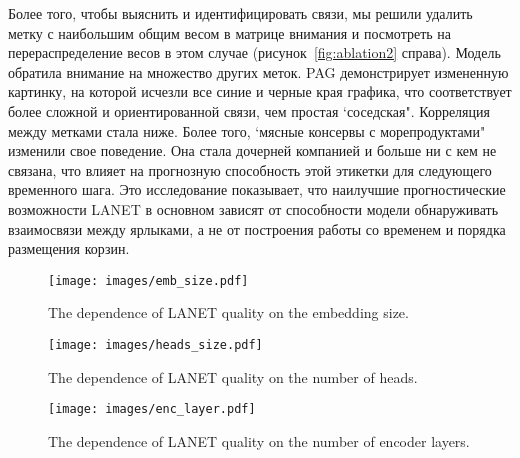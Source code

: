 \documentclass[a4paper, 12pt]{article} %
\begin{document}
Более того, чтобы выяснить и идентифицировать связи, мы решили удалить метку с наибольшим общим весом в матрице внимания и посмотреть на перераспределение весов в этом случае (рисунок~\ref{fig:ablation2} справа). Модель обратила внимание на множество других меток. PAG демонстрирует измененную картинку, на которой исчезли все синие и черные края графика, что соответствует более сложной и ориентированной связи, чем простая `соседская". Корреляция между метками стала ниже. Более того, `мясные консервы с морепродуктами" изменили свое поведение. Она стала дочерней компанией и больше ни с кем не связана, что влияет на прогнозную способность этой этикетки для следующего временного шага. Это исследование показывает, что наилучшие прогностические возможности LANET в основном зависят от способности модели обнаруживать взаимосвязи между ярлыками, а не от построения работы со временем и порядка размещения корзин.
\begin{figure*}
    \centering
    \begin{minipage}{.3\textwidth}
    \centering
    \texttt{[image: images/emb\_size.pdf]}
    \caption{The dependence of LANET quality on the embedding size.}
    \vspace{10pt}
    \label{fig:test1_emb}
    \end{minipage}\hfill
    \begin{minipage}{.3\textwidth}
    \centering
    \texttt{[image: images/heads\_size.pdf]}
    \caption{The dependence of LANET quality on the number of heads.}
    \vspace{10pt}
    \label{fig:test2_head}
    \end{minipage}\hfill
    \begin{minipage}{.3\textwidth}
    \centering
    \texttt{[image: images/enc\_layer.pdf]}
    \caption{The dependence of LANET quality on the number of encoder layers.}
    \vspace{10pt}
    \label{fig:test3_layer}
    \end{minipage}
\end{figure*}
\end{document}
